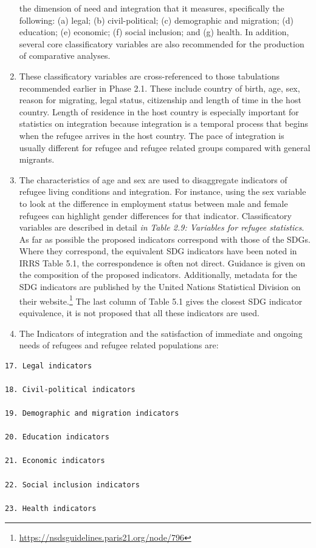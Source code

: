 \documentclass[
]{article}
\begin{document}
\begin{enumerate}
  the dimension of need and integration that it measures, specifically
  the following: (a) legal; (b) civil-political; (c) demographic and
  migration; (d) education; (e) economic; (f) social inclusion;
  and (g) health. In addition, several core classificatory variables
  are also recommended for the production of comparative analyses.
\item
  These classificatory variables are cross-referenced to those
  tabulations recommended earlier in Phase 2.1. These include country
  of birth, age, sex, reason for migrating, legal status, citizenship
  and length of time in the host country. Length of residence in the
  host country is especially important for statistics on integration
  because integration is a temporal process that begins when the
  refugee arrives in the host country. The pace of integration is
  usually different for refugee and refugee related groups compared
  with general migrants.
\item
  The characteristics of age and sex are used to disaggregate
  indicators of refugee living conditions and integration. For
  instance, using the sex variable to look at the difference in
  employment status between male and female refugees can highlight
  gender differences for that indicator. Classificatory variables are
  described in detail \emph{in} \emph{Table 2.9: Variables for refugee
  statistics}. As far as possible the proposed indicators correspond
  with those of the SDGs. Where they correspond, the equivalent SDG
  indicators have been noted in IRRS Table 5.1, the correspondence is
  often not direct. Guidance is given on the composition of the
  proposed indicators. Additionally, metadata for the SDG indicators
  are published by the United Nations Statistical Division on their
  website.\footnote{\url{https://nsdsguidelines.paris21.org/node/796}} The last column of Table 5.1 gives the closest SDG
  indicator equivalence, it is not proposed that all these indicators
  are used.
\item
  The Indicators of integration and the satisfaction of immediate and
  ongoing needs of refugees and refugee related populations are:
\end{enumerate}

\begin{verbatim}
17. Legal indicators

18. Civil-political indicators

19. Demographic and migration indicators

20. Education indicators

21. Economic indicators

22. Social inclusion indicators

23. Health indicators
\end{verbatim}
\end{document}
